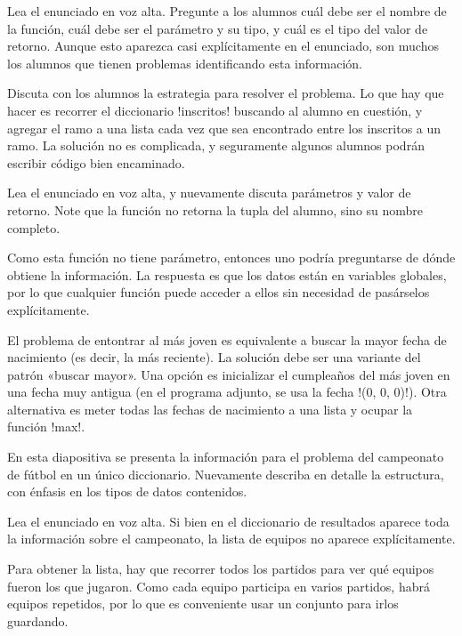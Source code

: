 \documentclass[10pt]{article}
\begin{document}

  Lea el enunciado en voz alta.
  Pregunte a los alumnos cuál debe ser el nombre de la función,
  cuál debe ser el parámetro y su tipo,
  y cuál es el tipo del valor de retorno.
  Aunque esto aparezca casi explícitamente en el enunciado,
  son muchos los alumnos que tienen problemas identificando esta información.

  Discuta con los alumnos la estrategia para resolver el problema.
  Lo que hay que hacer es recorrer el diccionario \li!inscritos!
  buscando al alumno en cuestión,
  y agregar el ramo a una lista cada vez que sea encontrado
  entre los inscritos a un ramo.
  La solución no es complicada,
  y seguramente algunos alumnos podrán escribir código bien encaminado.


  Lea el enunciado en voz alta,
  y nuevamente discuta parámetros y valor de retorno.
  Note que la función no retorna la tupla del alumno,
  sino su nombre completo.

  Como esta función no tiene parámetro,
  entonces uno podría preguntarse de dónde obtiene la información.
  La respuesta es que los datos están en variables globales,
  por lo que cualquier función puede acceder a ellos
  sin necesidad de pasárselos explícitamente.

  El problema de entontrar al más joven
  es equivalente a buscar la mayor fecha de nacimiento
  (es decir, la más reciente).
  La solución debe ser una variante del patrón «buscar mayor».
  Una opción es inicializar el cumpleaños del más joven en una fecha muy antigua
  (en el programa adjunto, se usa la fecha \li!(0, 0, 0)!).
  Otra alternativa es meter todas las fechas de nacimiento a una lista
  y ocupar la función \li!max!.


  En esta diapositiva se presenta la información
  para el problema del campeonato de fútbol
  en un único diccionario.
  Nuevamente describa en detalle la estructura,
  con énfasis en los tipos de datos contenidos.


  Lea el enunciado en voz alta.
  Si bien en el diccionario de resultados
  aparece toda la información sobre el campeonato,
  la lista de equipos no aparece explícitamente.

  Para obtener la lista,
  hay que recorrer todos los partidos
  para ver qué equipos fueron los que jugaron.
  Como cada equipo participa en varios partidos,
  habrá equipos repetidos,
  por lo que es conveniente usar un conjunto para irlos guardando.
\end{document}
